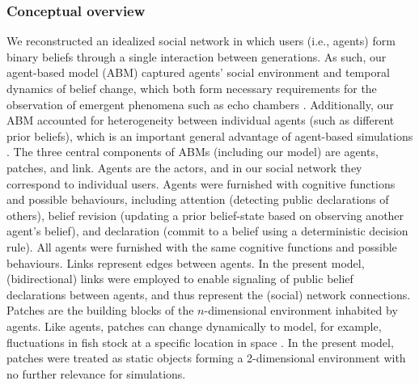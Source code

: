 \documentclass[doc,floatsintext]{apa6}
\begin{document}
\subsubsection{Conceptual overview}
We reconstructed an idealized social network in which users (i.e., agents) form binary beliefs through a single interaction between generations.
As such, our agent-based model (ABM) captured agents' social environment and temporal dynamics of belief change, which both form necessary requirements for the observation of emergent phenomena such as echo chambers \citep{madsen2019analytic}. Additionally, our ABM accounted for heterogeneity between individual agents (such as different prior beliefs), which is an important general advantage of agent-based simulations \citep{wilensky2015introduction}. The three central components of ABMs (including our model) are agents, patches, and link. Agents are the actors, and in our social network they correspond to individual users. Agents were furnished with cognitive functions and possible behaviours, including attention (detecting public declarations of others), belief revision (updating a prior belief-state based on observing another agent’s belief), and declaration (commit to a belief using a deterministic decision rule). All agents were furnished with the same cognitive functions and possible behaviours. Links represent edges between agents. In the present model, (bidirectional) links were employed to enable signaling of public belief declarations between agents, and thus represent the (social) network connections. Patches are the building blocks of the \(n\)-dimensional environment inhabited by agents. Like agents, patches can change dynamically to model, for example, fluctuations in fish stock at a specific location in space \citep{bailey2019computational}. In the present model, patches were treated as static objects forming a 2-dimensional environment with no further relevance for  simulations.
\end{document}
